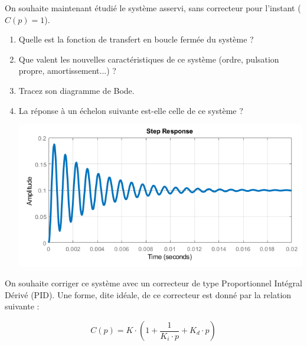 
On souhaite maintenant étudié le système asservi, sans correcteur pour l'instant ($C(p) = 1$).

\begin{enumerate}
	\item Quelle est la fonction de transfert en boucle fermée du système ?	
	\item Que valent les nouvelles caractéristiques de ce système (ordre, pulsation propre, amortissement...) ?
	\item Tracez son diagramme de Bode.
	\item La réponse à un échelon suivante est-elle celle de ce système ?
		\begin{center}
			\includegraphics[width=14cm]{images/TD/step_BF.png}
		\end{center}	
\end{enumerate}


On souhaite corriger ce système avec un correcteur de type Proportionnel Intégral Dérivé (PID). Une forme, dite idéale, de ce correcteur est donné par la relation suivante :

$$C(p) = K \cdot (1 + \frac{1}{K_i \cdot p} + K_d \cdot p)$$

